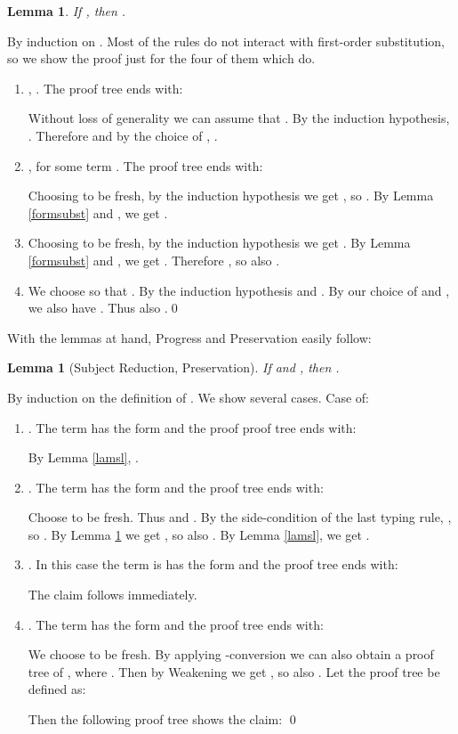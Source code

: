 \documentclass{LMCS}
\newtheorem{lemma}[thm]{Lemma}
\begin{document}
\begin{lemma}\label{logsl}
If , then .
\end{lemma}
\proof By induction on . Most of the rules do not interact with
first-order substitution, so we show the proof just for the four of them which
do. 
\begin{enumerate}[]
\item , . The proof tree ends with:

Without loss of generality we can assume that . By the induction hypothesis, . Therefore  and by the choice of , . 
\item ,  for some term . The proof tree ends with:

Choosing  to be fresh, by the induction hypothesis we get , so . By Lemma \ref{formsubst} and , we
get .
\item 

Choosing  to be fresh, by the induction hypothesis we get . 
By Lemma \ref{formsubst} and , we get . Therefore , so also .
\item

We choose  so that . By the induction hypothesis  and . By our choice of  and , we also
have . Thus also .\qed
\end{enumerate}


With the lemmas at hand, Progress and Preservation easily follow:

\begin{lemma}[Subject Reduction, Preservation]
If  and , then .
\end{lemma}
\proof By induction on the definition of . We show several cases. Case  of:
\begin{enumerate}[]
\item . The term  has
the form  and the proof 
proof tree  ends with:

By Lemma \ref{lamsl}, .
\item .
The term  has the form 
and the proof tree  ends with:

Choose  to be fresh. Thus  and . By the side-condition of the last
typing rule, , so . By Lemma
\ref{logsl} we get ,
so also . By Lemma \ref{lamsl}, we
get .
\item . In this
case the term
 is has the form   and the proof tree ends with:

The claim follows immediately.
\item . The term  has the form  and the proof tree ends with:

We choose  to be fresh. By applying -conversion we can also obtain a proof
tree of , where . Then
by Weakening we get , so also . Let the proof tree  be defined as:

Then the following proof tree shows the claim:
\qed
\end{enumerate}
\end{document}
